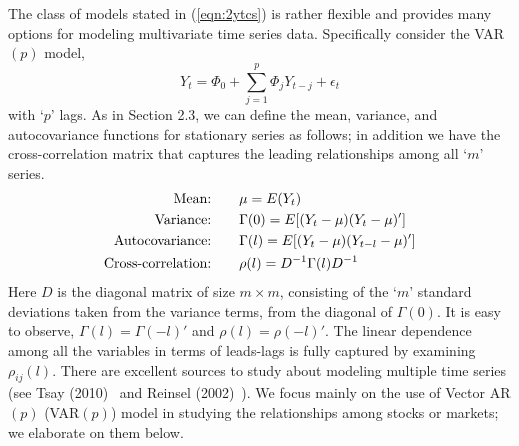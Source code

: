 The class of models stated in (\ref{eqn:2ytcs}) is rather flexible and provides many options for modeling multivariate time series data. Specifically consider the VAR$(p)$ model,
	\begin{equation}\label{eqn:ytphi0}
	Y_{t} = \Phi_0 + \sum_{j=1}^{p}\Phi_jY_{t-j}+\epsilon_t 
	\end{equation}
with `$p$' lags. As in Section 2.3, we can define the mean, variance, and autocovariance functions for stationary series as follows; in addition we have the cross-correlation matrix that captures the leading relationships among all `$m$' series.
\begin{align*}
            \text{Mean:\qquad} & \mu= E(Y_t)\\
            \text{Variance:\qquad} & \Gamma(0)= E[(Y_t-\mu)(Y_t-\mu)']\\
            \text{Autocovariance:\qquad} & \Gamma(l)= E[(Y_t-\mu)(Y_{t-l}-\mu)']\\
            \text{Cross-correlation:\qquad} & \rho(l) = D^{-1}\Gamma(l) D^{-1}
\end{align*}
Here $D$ is the diagonal matrix of size $m \times m$, consisting of the `$m$' standard deviations taken from the variance terms, from the diagonal of $\Gamma(0)$. It is easy to observe,  $\Gamma(l)= \Gamma(-l)'$ and $\rho(l)=\rho(-l)'$. The linear dependence among all the variables in terms of leads-lags is fully captured by examining $\rho_{ij}(l)$. There are excellent sources to study about modeling multiple time series (see Tsay (2010)~\cite{tsay} and Reinsel (2002)~\cite{2002reinsel}). We focus mainly on the use of Vector AR$(p)$ (VAR$(p)$) model in studying the relationships among stocks or markets; we elaborate on them below.


